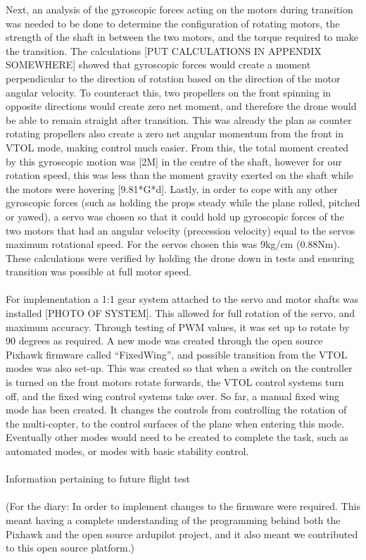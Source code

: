 Next, an analysis of the gyroscopic forces acting on the motors during transition was needed to be done to determine the configuration of rotating motors, the strength of the shaft in between the two motors, and the torque required to make the transition. The calculations \color{red}[PUT CALCULATIONS IN APPENDIX SOMEWHERE]\color{black} showed that gyroscopic forces would create a moment perpendicular to the direction of rotation based on the direction of the motor angular velocity. To counteract this, two propellers on the front spinning in opposite directions would create zero net moment, and therefore the drone would be able to remain straight after transition. This was already the plan as counter rotating propellers also create a zero net angular momentum from the front in VTOL mode, making control much easier.  From this, the total moment created by this gyroscopic motion was \color{red}[2M]\color{black} in the centre of the shaft, however for our rotation speed, this was less than the moment gravity exerted on the shaft while the motors were hovering \color{red}[9.81*G*d]\color{black}. Lastly, in order to cope with any other gyroscopic forces (such as holding the props steady while the plane rolled, pitched or yawed), a servo was chosen so that it could hold up gyroscopic forces of the two motors that had an angular velocity (precession velocity) equal to the servos maximum rotational speed. For the servos chosen this was 9kg/cm (0.88Nm). These calculations were verified by holding the drone down in tests and ensuring transition was possible at full motor speed.
\\\\
For implementation a 1:1 gear system attached to the servo and motor shafts was installed \color{red}[PHOTO OF SYSTEM]\color{black}. This allowed for full rotation of the servo, and maximum accuracy.  Through testing of PWM values, it was set up to rotate by 90 degrees as required. A new mode was created through the open source Pixhawk firmware called “FixedWing”, and possible transition from the VTOL modes was also set-up. This was created so that when a switch on the controller is turned on the front motors rotate forwards, the VTOL control systems turn off, and the fixed wing control systems take over. So far, a manual fixed wing mode has been created. It changes the controls from controlling the rotation of the multi-copter, to the control surfaces of the plane when entering this mode.  Eventually other modes would need to be created to complete the task, such as automated modes, or modes with basic stability control. 
\\\\
\color{red}
Information pertaining to future flight test
\\\\
(For the diary: In order to implement changes to the firmware were required.  This meant having  a complete understanding of the programming behind both the Pixhawk and the open source ardupilot project, and it also meant we contributed to this open source platform.)
\color{black}
